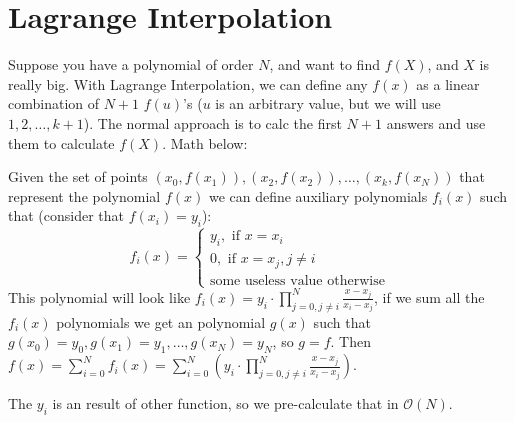     
    \section{Lagrange Interpolation}
    Suppose you have a polynomial of order $N$, and want to find $f(X)$, and $X$ is really big. With Lagrange Interpolation, we can define any $f(x)$ as a linear combination of $N+1$ $f(u)$'s ($u$ is an arbitrary value, but we will use $1,2,\dots,k+1$). The normal approach is to calc the first $N+1$ answers and use them to calculate $f(X)$. Math below:

    Given the set of points $(x_0,f(x_1)),(x_2,f(x_2)),\dots,(x_k,f(x_N))$ that represent the polynomial $f(x)$ we can define auxiliary polynomials $f_i(x)$ such that (consider that $f(x_i) = y_i$):
    \[
    f_i(x) = \begin{cases}
    y_i, \text{ if } x = x_i \\
    0, \text{ if } x = x_j, j \neq i \\
    \text{some useless value otherwise}
    \end{cases}
    \] 
    This polynomial will look like $\displaystyle f_i(x) = y_i \cdot \prod_{j=0,j \neq i}^{N} \frac{x-x_j}{x_i-x_j}$, if we sum all the $f_i(x)$ polynomials we get an polynomial $g(x)$ such that $g(x_0) = y_0, g(x_1) = y_1, \dots, g(x_N) = y_N$, so $g = f$. Then $f(x) = \displaystyle \sum_{i=0}^N f_i(x) = \sum_{i=0}^N \left(y_i \cdot \prod_{j=0,j \neq i}^N \frac{x-x_j}{x_i-x_j}\right)$.

    The $y_i$ is an result of other function, so we pre-calculate that in $\mathcal{O}(N)$.

